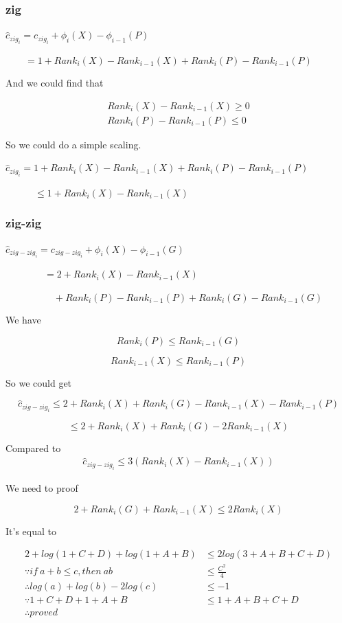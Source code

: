 \documentclass{article}
\begin{document}
\subsubsection{zig}
$ \hat c_{zig_i} = c_{zig_i} + \phi_i(X) - \phi_{i-1}(P)$

$ \qquad = 1 + Rank_i(X) - Rank_{i-1}(X) + Rank_i(P) - Rank_{i-1}(P)$

And we could find that\par
\begin{align*}
    Rank_i(X) - Rank_{i-1}(X) \geq 0\\
    Rank_i(P) - Rank_{i-1}(P) \leq 0
\end{align*}

So we could do a simple scaling.\par
$\hat c_{zig_i} = 1 + Rank_i(X) - Rank_{i-1}(X) + Rank_i(P) - Rank_{i-1}(P)$\par
$\qquad \quad \leq 1 + Rank_i(X) - Rank_{i-1}(X)$

\subsubsection{zig-zig}
$\hat c_{zig-zig_i} = c_{zig-zig_i} + \phi_i(X) - \phi_{i-1}(G)$\par
$\qquad \qquad = 2 + Rank_i(X) - Rank_{i-1}(X) $\par
$\qquad \qquad \quad + Rank_i(P) - Rank_{i-1}(P) + Rank_i(G) - Rank_{i-1}(G)$

We have

$$ Rank_i(P) \leq Rank_{i-1}(G)$$

$$ Rank_{i-1}(X) \leq Rank_{i-1}(P)$$

So we could get

$$\hat c_{zig-zig_i} \leq 2 + Rank_i(X) + Rank_i(G) - Rank_{i-1}(X) - Rank_{i-1}(P)$$

$$\leq 2 + Rank_i(X) + Rank_i(G) - 2Rank_{i-1}(X)$$

Compared to
\begin{align*}
    \hat c_{zig-zig_i} \leq 3(Rank_i(X) - Rank_{i-1}(X))
\end{align*}

We need to proof

$$ 2 + Rank_i(G) + Rank_{i-1}(X) \leq 2Rank_i(X)$$

It's equal to

\begin{align*}
    2 + log(1+C+D) + log(1+A+B) &\leq 2log(3+A+B+C+D)\\
    \because if \ a+b \leq c, then \ ab &\leq \frac{C^2}{4}\\
    \therefore log(a) + log(b) - 2log(c) &\leq -1\\
    \because 1+C+D+1+A+B &\leq 1+A+B+C+D \\
    \therefore proved
\end{align*}
\end{document}
